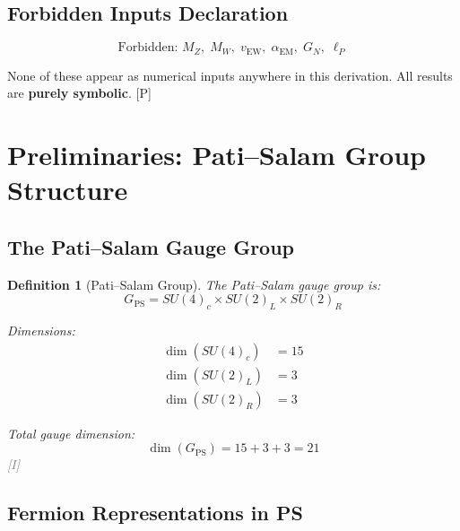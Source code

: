 \documentclass[11pt,a4paper]{article}
\newtheorem{definition}[theorem]{Definition}
\newcommand{\tagP}{\textcolor{green!50!black}{[P]}}
\newcommand{\tagI}{\textcolor{gray}{[I]}}
\begin{document}
\subsection{Forbidden Inputs Declaration}

\begin{equation}
\label{eq:forbidden}
\boxed{\text{Forbidden: } M_Z,\; M_W,\; v_{\text{EW}},\; \alpha_{\text{EM}},\; G_N,\; \ell_P}
\end{equation}

None of these appear as numerical inputs anywhere in this derivation.
All results are \textbf{purely symbolic}. \tagP

\section{Preliminaries: Pati--Salam Group Structure}
\label{sec:prelim}

\subsection{The Pati--Salam Gauge Group}

\begin{definition}[Pati--Salam Group]
\label{def:ps-group}
The Pati--Salam gauge group is:
\begin{equation}
\label{eq:ps-group}
G_{\text{PS}} = SU(4)_c \times SU(2)_L \times SU(2)_R
\end{equation}

Dimensions:
\begin{align}
\label{eq:dim-su4}
\dim(SU(4)_c) &= 15 \\
\label{eq:dim-su2L}
\dim(SU(2)_L) &= 3 \\
\label{eq:dim-su2R}
\dim(SU(2)_R) &= 3
\end{align}

Total gauge dimension:
\begin{equation}
\label{eq:dim-ps-total}
\dim(G_{\text{PS}}) = 15 + 3 + 3 = 21
\end{equation}
\tagI
\end{definition}

\subsection{Fermion Representations in PS}
\end{document}
